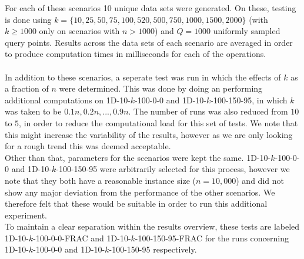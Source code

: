 \documentclass{article}
\newcommand{\fb}[1]{{#1}}
\newcommand{\fbrm}[1]{{}}
\begin{document}
For each of these scenarios 10 unique data sets were generated. On these, testing \fb{is} done using $k=\{10, 25, 50, 75, 100, 520, 500, 750, 1000, 1500, 2000\}$ (with $k\geq1000$ only on scenarios with $n > 1000$) and $Q=1000$ uniformly sampled query points. Results across the data sets of each scenario are averaged in order to produce computation times in milliseconds for each of the operations. \\\\
In addition to these scenarios, a seperate test was run in which the effects of $k$ as a fraction of $n$ were determined. This was done by doing an performing additional computations on 1D-10-$k$-100-0-0 and 1D-10-$k$-100-150-95, in which $k$ was taken to be $0.1n, 0.2n, ..., 0.9n$. The number of runs was also reduced from $10$ to $5$, in order to reduce the computational load for this set of tests. We note that this might increase the variability of the results, however as we are only looking for a rough trend this was deemed acceptable.\\ Other than that, parameters for the scenarios were kept the same. 1D-10-$k$-100-0-0 and 1D-10-$k$-100-150-95 were arbitrarily selected for this process, however we note that they both have a reasonable instance size ($n=10,000$) and did not show any major deviation from the performance of the other scenarios. We therefore felt that these would be suitable in order to run this additional experiment. \\
\fbrm{In order t}To maintain a clear separation within the results overview, these tests are labeled 1D-10-$k$-100-0-0-FRAC and 1D-10-$k$-100-150-95-FRAC for the runs concerning 1D-10-$k$-100-0-0 and 1D-10-$k$-100-150-95 respectively.
\end{document}
